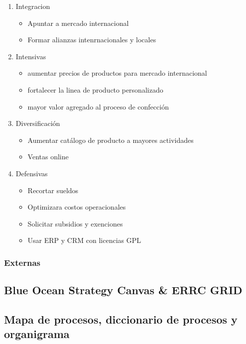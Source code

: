 \documentclass[11pt]{article}
\begin{document}
\begin{enumerate}
\item Integracion
\label{sec:orgdad2ffc}
\begin{itemize}
\item Apuntar a mercado internacional
\item Formar alianzas intenrnacionales y locales
\end{itemize}

\item Intensivas
\label{sec:org05d4567}
\begin{itemize}
\item aumentar precios de productos para mercado internacional
\item fortalecer la linea de producto personalizado
\item mayor valor agregado al proceso de confección
\end{itemize}

\item Diversificación
\label{sec:orgd1a5a4d}

\begin{itemize}
\item Aumentar catálogo de producto a mayores actividades
\item Ventas online
\end{itemize}

\item Defensivas
\label{sec:org46da924}
\begin{itemize}
\item Recortar sueldos
\item Optimizara costos operacionales
\item Solicitar subsidios y exenciones
\item Usar ERP y CRM con licencias GPL
\end{itemize}
\end{enumerate}

\subsubsection{Externas}
\label{sec:orgf7a4339}
\subsection{Blue Ocean Strategy Canvas \& ERRC GRID}
\label{sec:org1ff7d0d}
\subsection{Mapa de procesos, diccionario de procesos y organigrama}
\label{sec:orgbe222ba}
\end{document}
